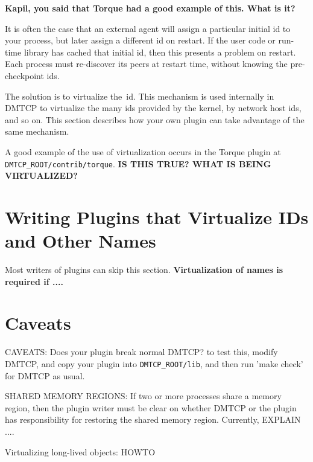 \documentclass{article}
\begin{document}
{\bf Kapil, you said that Torque had a good example of this.  What is it?}

It is often the case that an external agent will assign a particular
initial id to your process, but later assign a different id on restart.
If the user code or run-time library has cached that initial id, then
this presents a problem on restart.  Each process must re-discover its
peers at restart time, without knowing the pre-checkpoint ids.

The solution is to virtualize the~id.
This mechanism is used internally in DMTCP to virtualize the
many ids provided by the kernel, by network host ids, and so on.
This section describes how your own plugin can take advantage of
the same mechanism.

A good example of the use of virtualization occurs in the Torque
plugin at {\tt DMTCP\_ROOT/contrib/torque}.  {\bf IS THIS TRUE?  WHAT IS
BEING VIRTUALIZED?}

\section{Writing Plugins that Virtualize IDs and Other Names}
\label{sec:virtualization}

Most writers of plugins can skip this section.  {\bf Virtualization
of names is required if ....}

\section{Caveats}

CAVEATS:
Does your plugin break normal DMTCP?  to test this, modify DMTCP, and copy your
plugin into {\tt DMTCP\_ROOT/lib}, and then run 'make check' for DMTCP as usual.

SHARED MEMORY REGIONS:
If two or more processes share a memory region, then the plugin writer must
be clear on whether DMTCP or the plugin has responsibility for restoring
the shared memory region.  Currently, EXPLAIN ....

Virtualizing long-lived objects:  HOWTO
\end{document}
